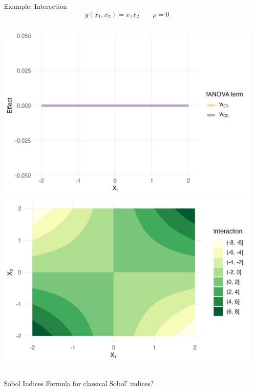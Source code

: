\begin{frame}{Example: Interaction}
  \[
  y(x_1, x_2) = x_1 x_2 \qquad \rho = 0
  \]
    \begin{columns}
      \includegraphics[width=\linewidth]{../images/experiment_section/interaction_a1p00_a2p00_a11p00_a22p00_a12p20_rhop00_main.png}
      \includegraphics[width=\linewidth]{../images/experiment_section/interaction_a1p00_a2p00_a11p00_a22p00_a12p20_rhop00_interaction.png}
  \end{columns}
  
\end{frame}


\begin{frame}{Sobol Indices}
    Formula for classical Sobol' indices?
\end{frame}

